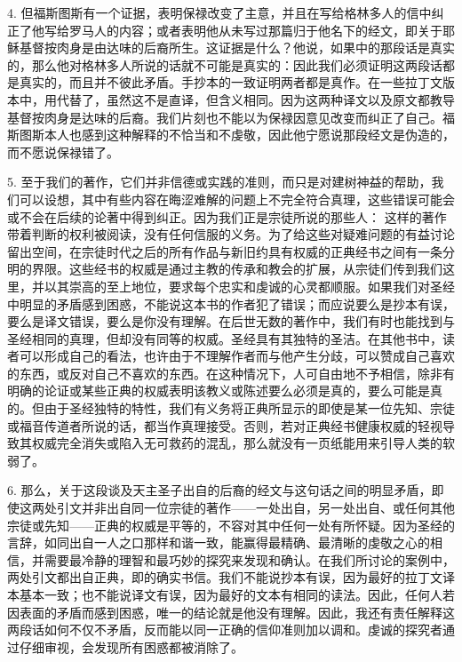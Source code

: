 4. 但福斯图斯有一个证据，表明保禄改变了主意，并且在写给格林多人的信中纠正了他写给罗马人的内容；或者表明他从未写过那篇归于他名下的经文，即关于耶稣基督按肉身是由达味的后裔所生。这证据是什么？他说，如果中的那段话是真实的，那么他对格林多人所说的话就不可能是真实的：因此我们必须证明这两段话都是真实的，而且并不彼此矛盾。手抄本的一致证明两者都是真作。在一些拉丁文版本中，用代替了，虽然这不是直译，但含义相同。因为这两种译文以及原文都教导基督按肉身是达味的后裔。我们片刻也不能以为保禄因意见改变而纠正了自己。福斯图斯本人也感到这种解释的不恰当和不虔敬，因此他宁愿说那段经文是伪造的，而不愿说保禄错了。\par

5. 至于我们的著作，它们并非信德或实践的准则，而只是对建树神益的帮助，我们可以设想，其中有些内容在晦涩难解的问题上不完全符合真理，这些错误可能会或不会在后续的论著中得到纠正。因为我们正是宗徒所说的那些人： 这样的著作带着判断的权利被阅读，没有任何信服的义务。为了给这些对疑难问题的有益讨论留出空间，在宗徒时代之后的所有作品与新旧约具有权威的正典经书之间有一条分明的界限。这些经书的权威是通过主教的传承和教会的扩展，从宗徒们传到我们这里，并以其崇高的至上地位，要求每个忠实和虔诚的心灵都顺服。如果我们对圣经中明显的矛盾感到困惑，不能说这本书的作者犯了错误；而应说要么是抄本有误，要么是译文错误，要么是你没有理解。在后世无数的著作中，我们有时也能找到与圣经相同的真理，但却没有同等的权威。圣经具有其独特的圣洁。在其他书中，读者可以形成自己的看法，也许由于不理解作者而与他产生分歧，可以赞成自己喜欢的东西，或反对自己不喜欢的东西。在这种情况下，人可自由地不予相信，除非有明确的论证或某些正典的权威表明该教义或陈述要么必须是真的，要么可能是真的。但由于圣经独特的特性，我们有义务将正典所显示的即使是某一位先知、宗徒或福音传道者所说的话，都当作真理接受。否则，若对正典经书健康权威的轻视导致其权威完全消失或陷入无可救药的混乱，那么就没有一页纸能用来引导人类的软弱了。\par

6. 那么，关于这段谈及天主圣子出自的后裔的经文与这句话之间的明显矛盾，即使这两处引文并非出自同一位宗徒的著作——一处出自，另一处出自、或任何其他宗徒或先知——正典的权威是平等的，不容对其中任何一处有所怀疑。因为圣经的言辞，如同出自一人之口那样和谐一致，能赢得最精确、最清晰的虔敬之心的相信，并需要最冷静的理智和最巧妙的探究来发现和确认。在我们所讨论的案例中，两处引文都出自正典，即的确实书信。我们不能说抄本有误，因为最好的拉丁文译本基本一致；也不能说译文有误，因为最好的文本有相同的读法。因此，任何人若因表面的矛盾而感到困惑，唯一的结论就是他没有理解。因此，我还有责任解释这两段话如何不仅不矛盾，反而能以同一正确的信仰准则加以调和。虔诚的探究者通过仔细审视，会发现所有困惑都被消除了。\par

